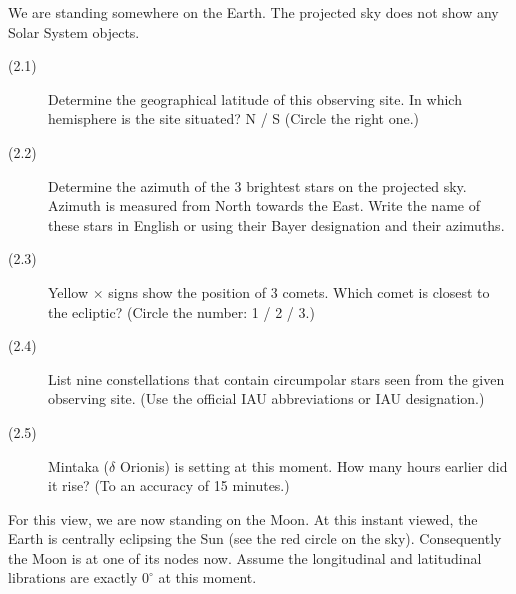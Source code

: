 
We are standing somewhere on the Earth. The projected sky does not show any
Solar System objects.

\begin{description}
\item[(2.1)] Determine the geographical latitude of this observing site. In
  which hemisphere is the site situated? N / S (Circle the right one.)
\item[(2.2)] Determine the azimuth of the 3 brightest stars on the projected
  sky. Azimuth is measured from North towards the East. Write the name of
  these stars in English or using their Bayer designation and their
  azimuths.
\item[(2.3)] Yellow $\times$ signs show the position of 3 comets. Which
  comet is closest to the ecliptic? (Circle the number: 1 / 2 / 3.)
\item[(2.4)] List nine constellations that contain circumpolar stars seen
  from the given observing site. (Use the official IAU abbreviations or IAU
  designation.)
\item[(2.5)] Mintaka ($\delta$ Orionis) is setting at this moment. How many
  hours earlier did it rise? (To an accuracy of 15 minutes.)
\end{description}

For this view, we are now standing on the Moon. At this instant viewed, the
Earth is centrally eclipsing the Sun (see the red circle on the sky).
Consequently the Moon is at one of its nodes now. Assume the longitudinal
and latitudinal librations are exactly $0^\circ$ at this moment.


